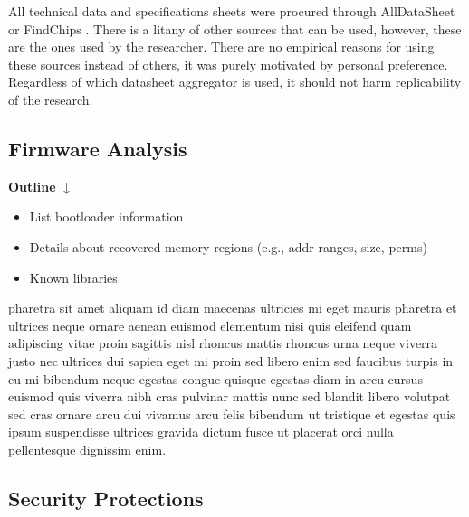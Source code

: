 


All technical data and specifications sheets were procured through AllDataSheet or FindChips \autocite{ALLDATASHEETCOMElectronic,FindchipsElectronicPart}. There is a litany of other sources that can be used, however, these are the ones used by the researcher. There are no empirical reasons for using these sources instead of others, it was purely motivated by personal preference. Regardless of which datasheet aggregator is used, it should not harm replicability of the research.

\subsection{Firmware Analysis} \label{firmwareanalysis}

\textbf{Outline}
$\downarrow$

\begin{itemize}
    \item List bootloader information
    \item Details about recovered memory regions (e.g., addr ranges, size, perms)
    \item Known libraries
\end{itemize}

pharetra sit amet aliquam id diam maecenas ultricies mi eget mauris pharetra et ultrices neque ornare aenean euismod elementum nisi quis eleifend quam adipiscing vitae proin sagittis nisl rhoncus mattis rhoncus urna neque viverra justo nec ultrices dui sapien eget mi proin sed libero enim sed faucibus turpis in eu mi bibendum neque egestas congue quisque egestas diam in arcu cursus euismod quis viverra nibh cras pulvinar mattis nunc sed blandit libero volutpat sed cras ornare arcu dui vivamus arcu felis bibendum ut tristique et egestas quis ipsum suspendisse ultrices gravida dictum fusce ut placerat orci nulla pellentesque dignissim enim.

\subsection{Security Protections} \label{securityprotections}

